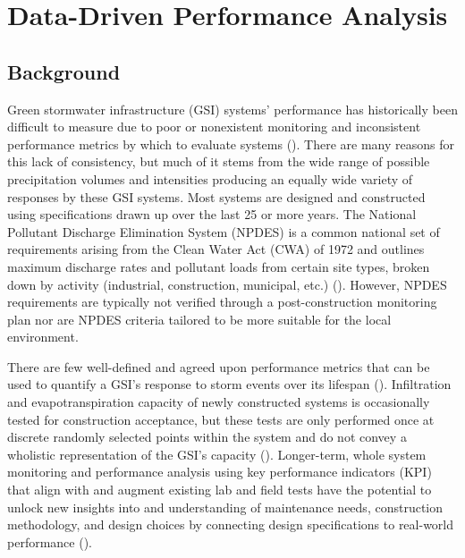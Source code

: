 %
\chapter{Data-Driven Performance Analysis}
\label{sec:data-analysis}

\section{Background}
Green stormwater infrastructure (GSI) systems' performance has historically been difficult to measure due to poor or nonexistent monitoring and inconsistent performance metrics by which to evaluate systems (\cite{Meng2017}).
There are many reasons for this lack of consistency, but much of it stems from the wide range of possible precipitation volumes and intensities producing an equally wide variety of responses by these GSI systems.
Most systems are designed and constructed using specifications drawn up over the last 25 or more years.
The National Pollutant Discharge Elimination System (NPDES) is a common national set of requirements arising from the Clean Water Act (CWA) of 1972 and outlines maximum discharge rates and pollutant loads from certain site types, broken down by activity (industrial, construction, municipal, etc.) (\cite{USEPA2009}).
However, NPDES requirements are typically not verified through a post-construction monitoring plan nor are NPDES criteria tailored to be more suitable for the local environment.

There are few well-defined and agreed upon performance metrics that can be used to quantify a GSI's response to storm events over its lifespan (\cite{Davis2012a}).
Infiltration and evapotranspiration capacity of newly constructed systems is occasionally tested for construction acceptance, but these tests are only performed once at discrete randomly selected points within the system and do not convey a wholistic representation of the GSI's capacity (\cite{Brown2012, DelGrosso2019}).
Longer-term, whole system monitoring and performance analysis using key performance indicators (KPI) that align with and augment existing lab and field tests have the potential to unlock new insights into and understanding of maintenance needs, construction methodology, and design choices by connecting design specifications to real-world performance (\cite{Geberemariam}).

